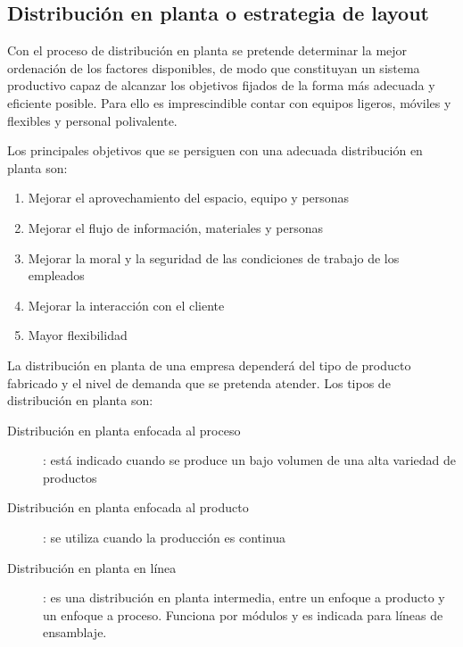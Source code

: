 \documentclass[10pt,a4paper,spanish]{report}
\begin{document}
            \subsection{\textcolor[rgb]{0.9,0.7,0.6}Distribución en planta o estrategia de layout}

                  Con el proceso de distribución en planta se pretende determinar la mejor ordenación de los factores disponibles, de modo que constituyan un sistema productivo capaz de alcanzar los objetivos fijados de la forma más adecuada y eficiente posible. Para ello es imprescindible contar con equipos ligeros, móviles y flexibles y personal polivalente.

                  Los principales objetivos que se persiguen con una adecuada distribución en planta son:
                  \begin{enumerate} [---]
                        \item Mejorar el aprovechamiento del espacio, equipo y personas
                        \item Mejorar el flujo de información, materiales y personas
                        \item Mejorar la moral y la seguridad de las condiciones de trabajo de los empleados
                        \item Mejorar la interacción con el cliente
                        \item Mayor flexibilidad
                  \end{enumerate}

                  La distribución en planta de una empresa dependerá del tipo de producto fabricado y el nivel de demanda que se pretenda atender. Los tipos de distribución en planta son:

                  \begin{description}
                        \item[Distribución en planta enfocada al proceso]: está indicado cuando se produce un bajo volumen de una alta variedad de productos
                        \item[Distribución en planta enfocada al producto]: se utiliza cuando la producción es continua
                        \item[Distribución en planta en línea]: es una distribución en planta intermedia, entre un enfoque a producto y un enfoque a proceso. Funciona por módulos y es indicada para líneas de ensamblaje.
                  \end{description}
\end{document}
